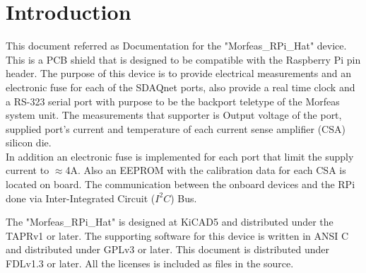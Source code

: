 \section{Introduction}
This document referred as Documentation for the "Morfeas\_RPi\_Hat" device. This is a PCB shield that is designed to be compatible with the Raspberry Pi pin header.
The purpose of this device is to provide electrical measurements and an electronic fuse for each of the SDAQnet ports, also provide a real time clock and 
a RS-323 serial port with purpose to be the backport teletype of the Morfeas system unit. 
The measurements that supporter is Output voltage of the port, supplied port's current and temperature of each current sense amplifier (CSA) silicon die.\\
In addition an electronic fuse is implemented for each port that limit the supply current to $\approx$4A.
Also an EEPROM with the calibration data for each CSA is located on board. The communication between the onboard devices and the RPi done
via Inter-Integrated Circuit ($I^2C$) Bus.

The "Morfeas\_RPi\_Hat" is designed at KiCAD5 and distributed under the TAPRv1 or later. 
The supporting software for this device is written in ANSI C and distributed under GPLv3 or later. 
This document is distributed under FDLv1.3 or later.
All the licenses is included as files in the source.